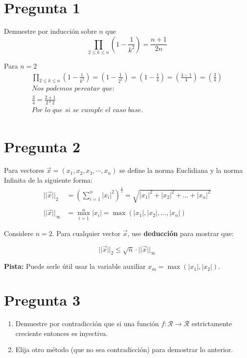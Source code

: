 \documentclass[spanish, fleqn]{article}
\title{Estructuras Discretas \\
       Tarea \#\num \\
       ``Demuestre que sabe demostrar''}
\author{Andrés Navarro \\ (201673001-k)}
\date{}
\begin{document}
\maketitle
\thispagestyle{empty}

\section*{Pregunta 1}
Demuestre por inducción sobre \(n\) que
\[
\prod_{2 \leq k \leq n} \left( 1 - \frac{1}{k^2} \right) = \frac{n+1}{2n}
\]

Para $n=2$
\begin{align*}
\prod_{2 \leq k \leq n} \left( 1 - \frac{1}{k^2} \right)=\left( 1 - \frac{1}{2^2} \right)=\left( 1 - \frac{1}{4} \right)=\left(\frac{4-1}{4} \right)=\left( \frac{3}{4} \right)\\
\textit{Nos podemos percatar que:}\\
\frac{3}{4}=\frac{2+1}{2*2}\\
\textit{Por lo que si se cumple el caso base.}\\
\end{align*}


\section*{Pregunta 2}
Para vectores \( \vec{x} = (x_1, x_2, x_3, \cdots, x_n) \) se define la norma Euclidiana y la norma Infinita de la siguiente forma:
\begin{align*}
	|| \vec{x} ||_2 &= 
    \left(
    \sum_{i=1}^{n} | x_i |^2
    \right)^\frac{1}{2}  = \sqrt{|x_1|^2+|x_2|^2+ ... + |x_n|^2}\\
    &\\
    || \vec{x} ||_{\infty} &= 
    \max_{i=1}^{n} |x_i| =  \max(|x_1|,|x_2|,...,|x_n|) 
\end{align*}

Considere \(n = 2\). Para cualquier vector \( \vec{x} \), use \textbf{deducción} para mostrar que:

\[
|| \vec{x} ||_2 \leq \sqrt{n} \cdot  || \vec{x} ||_{\infty}
\]

\textbf{Pista:} Puede serle útil usar la variable auxiliar \(x_m = \max(|x_1|, |x_2|)\).


\section*{Pregunta 3}
\begin{enumerate}
\item Demuestre por contradicción que si una función \(f: \mathcal{R} \rightarrow \mathcal{R}\) estrictamente creciente entonces es inyectiva.\\

\item Elija otro método  (que no sea contradicción) para demostrar lo anterior.
\end{enumerate}
\end{document}
